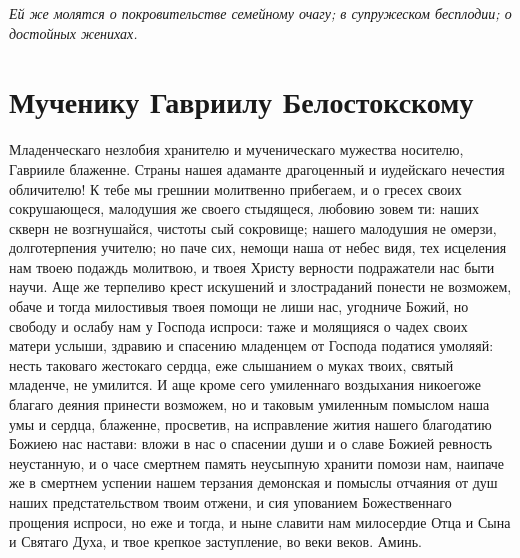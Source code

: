 \begin{mymulticols}
\itshape Ей же молятся о покровительстве семейному очагу; в супружеском бесплодии; о достойных женихах.\normalfont{}


\end{mymulticols}

\mychapterending




\section{Мученику Гавриилу Белостокскому}\begin{mymulticols}



Младенческаго незлобия хранителю и мученическаго мужества носителю, Гаврииле блаженне. Страны нашея адаманте драгоценный и иудейскаго нечестия обличителю! К тебе мы грешнии молитвенно прибегаем, и о гресех своих сокрушающеся, малодушия же своего стыдящеся, любовию зовем ти: наших скверн не возгнушайся, чистоты сый сокровище; нашего малодушия не омерзи, долготерпения учителю; но паче сих, немощи наша от небес видя, тех исцеления нам твоею подаждь молитвою, и твоея Христу верности подражатели нас быти научи. Аще же терпеливо крест искушений и злостраданий понести не возможем, обаче и тогда милостивыя твоея помощи не лиши нас, угодниче Божий, но свободу и ослабу нам у Господа испроси: таже и молящияся о чадех своих матери услыши, здравию и спасению младенцем от Господа податися умоляяй: несть таковаго жестокаго сердца, еже слышанием о муках твоих, святый младенче, не умилится. И аще кроме сего умиленнаго воздыхания никоегоже благаго деяния принести возможем, но и таковым умиленным помыслом наша умы и сердца, блаженне, просветив, на исправление жития нашего благодатию Божиею нас настави: вложи в нас о спасении души и о славе Божией ревность неустанную, и о часе смертнем память неусыпную хранити помози нам, наипаче же в смертнем успении нашем терзания демонская и помыслы отчаяния от душ наших предстательством твоим отжени, и сия упованием Божественнаго прощения испроси, но еже и тогда, и ныне славити нам милосердие Отца и Сына и Святаго Духа, и твое крепкое заступление, во веки веков. Аминь.




\end{mymulticols}

